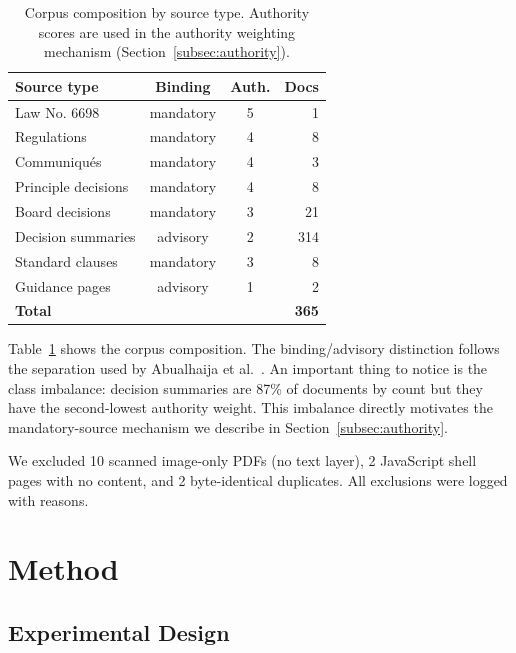 \documentclass[11pt,a4paper,twocolumn]{article}
\begin{document}
\begin{table}[t]
\centering
\caption{Corpus composition by source type. Authority scores are used in the authority weighting mechanism (Section~\ref{subsec:authority}).}
\label{tab:corpus}
\small
\begin{tabular}{@{}lccr@{}}
\toprule
\textbf{Source type} & \textbf{Binding} & \textbf{Auth.} & \textbf{Docs} \\
\midrule
Law No. 6698        & mandatory & 5 & 1 \\
Regulations         & mandatory & 4 & 8 \\
Communiqués         & mandatory & 4 & 3 \\
Principle decisions & mandatory & 4 & 8 \\
Board decisions     & mandatory & 3 & 21 \\
Decision summaries  & advisory  & 2 & 314 \\
Standard clauses    & mandatory & 3 & 8 \\
Guidance pages      & advisory  & 1 & 2 \\
\midrule
\textbf{Total}      &           &   & \textbf{365} \\
\bottomrule
\end{tabular}
\end{table}

Table~\ref{tab:corpus} shows the corpus composition. The binding/advisory distinction follows the separation used by Abualhaija et al.~\cite{abualhaija2025}. An important thing to notice is the class imbalance: decision summaries are 87\% of documents by count but they have the second-lowest authority weight. This imbalance directly motivates the mandatory-source mechanism we describe in Section~\ref{subsec:authority}.

We excluded 10 scanned image-only PDFs (no text layer), 2 JavaScript shell pages with no content, and 2 byte-identical duplicates. All exclusions were logged with reasons.


\section{Method}
\label{sec:method}

\subsection{Experimental Design}
\end{document}

